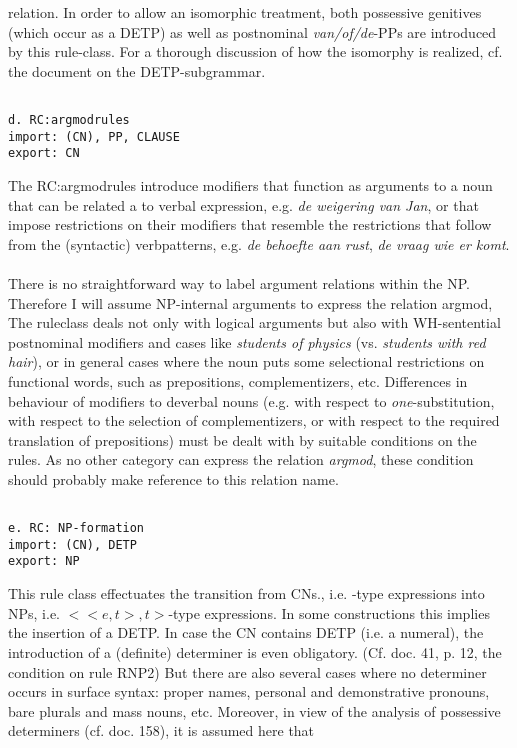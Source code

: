 relation. In order to allow an isomorphic treatment, both possessive genitives
(which occur as a DETP) as well as postnominal {\em van/of/de}-PPs are
introduced by this rule-class. For a thorough discussion of how the isomorphy
is realized, cf. the document on the DETP-subgrammar.
\begin{verbatim}

d. RC:argmodrules 
import: (CN), PP, CLAUSE
export: CN
\end{verbatim}
The RC:argmodrules introduce 
modifiers that function as arguments to a noun that can be related a to
verbal expression, e.g. {\em de weigering van Jan}, or that impose restrictions
on their modifiers that resemble the restrictions that follow from the
(syntactic) verbpatterns, e.g. {\em de behoefte aan rust}, {\em de vraag wie er
komt}.
\\ \\
There is no straightforward way to label argument relations within the NP.
Therefore I will assume NP-internal arguments to express the relation argmod,
The ruleclass deals not only with
logical arguments but also with WH-sentential postnominal modifiers and cases
like {\em students of physics} (vs. {\em students with red hair}), or in
general cases where the noun puts some selectional restrictions on functional
words, such as prepositions, complementizers, etc. Differences in behaviour of
modifiers to deverbal nouns (e.g. with respect to {\em one}-substitution, with
respect to the selection of complementizers, or with respect to the required
translation of prepositions) must be dealt with 
by suitable conditions on the rules.
As no other category can express the relation {\em argmod}, these condition
should probably make reference to this relation name.
\begin{verbatim}

e. RC: NP-formation
import: (CN), DETP
export: NP
\end{verbatim}
This rule class effectuates the transition from CNs., i.e. \(<e,t>\)-type
expressions into NPs, i.e. \(<<e,t>,t>\)-type 
expressions. In some constructions
this implies the insertion of a DETP. In case the CN contains DETP (i.e. a
numeral), the introduction of a (definite) determiner is even obligatory. (Cf.
doc. 41, p. 12, the condition on rule RNP2) But there are also several cases
where no determiner occurs in surface syntax: proper names, personal and
demonstrative pronouns, bare plurals and mass nouns, etc. Moreover, in view of
the analysis of possessive determiners (cf. doc. 158), it is assumed here that
